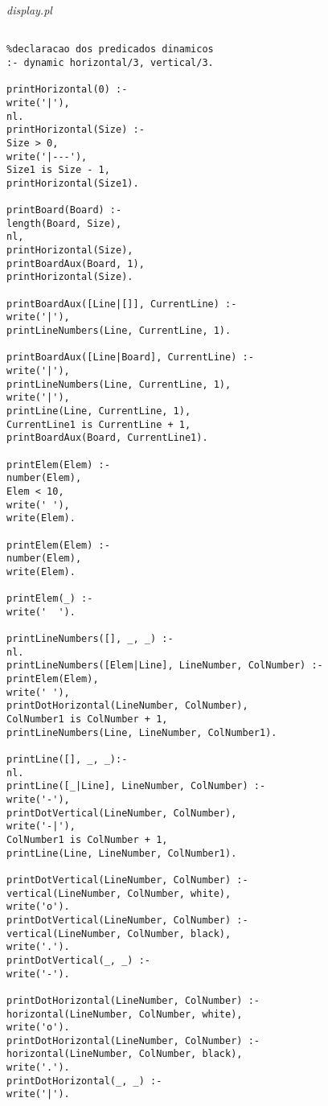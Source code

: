 \documentclass[runningheads,a4paper]{llncs}
\begin{document}
	\noindent
	{\it display.pl}
	\begin{changemargin}{-3cm}{-4cm}
		\begin{verbatim}
			
%declaracao dos predicados dinamicos
:- dynamic horizontal/3, vertical/3.

printHorizontal(0) :-
write('|'),
nl.
printHorizontal(Size) :-
Size > 0,
write('|---'),
Size1 is Size - 1,
printHorizontal(Size1).

printBoard(Board) :-
length(Board, Size),
nl,
printHorizontal(Size),
printBoardAux(Board, 1),
printHorizontal(Size).

printBoardAux([Line|[]], CurrentLine) :-
write('|'),
printLineNumbers(Line, CurrentLine, 1).

printBoardAux([Line|Board], CurrentLine) :-
write('|'),
printLineNumbers(Line, CurrentLine, 1),
write('|'),
printLine(Line, CurrentLine, 1),
CurrentLine1 is CurrentLine + 1,
printBoardAux(Board, CurrentLine1).

printElem(Elem) :-
number(Elem),
Elem < 10,
write(' '),
write(Elem).

printElem(Elem) :-
number(Elem),
write(Elem).

printElem(_) :-
write('  ').

printLineNumbers([], _, _) :-
nl.
printLineNumbers([Elem|Line], LineNumber, ColNumber) :-
printElem(Elem),
write(' '),
printDotHorizontal(LineNumber, ColNumber),
ColNumber1 is ColNumber + 1,
printLineNumbers(Line, LineNumber, ColNumber1).

printLine([], _, _):-
nl.
printLine([_|Line], LineNumber, ColNumber) :-
write('-'),
printDotVertical(LineNumber, ColNumber),
write('-|'),
ColNumber1 is ColNumber + 1,
printLine(Line, LineNumber, ColNumber1).

printDotVertical(LineNumber, ColNumber) :-
vertical(LineNumber, ColNumber, white),
write('o').
printDotVertical(LineNumber, ColNumber) :-
vertical(LineNumber, ColNumber, black),
write('.').
printDotVertical(_, _) :-
write('-').

printDotHorizontal(LineNumber, ColNumber) :-
horizontal(LineNumber, ColNumber, white),
write('o').
printDotHorizontal(LineNumber, ColNumber) :-
horizontal(LineNumber, ColNumber, black),
write('.').
printDotHorizontal(_, _) :-
write('|').

			
		\end{verbatim}
	\end{changemargin}
	
\end{document}
